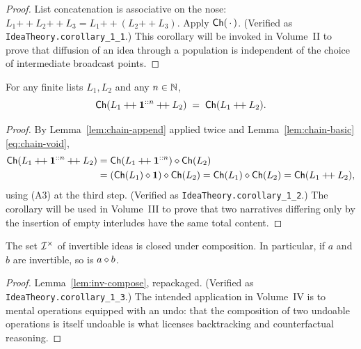 \begin{proof}
List concatenation is associative on the nose: $L_1 \mathbin{+\!+} L_2
\mathbin{+\!+} L_3 = L_1 \mathbin{+\!+} (L_2 \mathbin{+\!+} L_3)$.  Apply
$\mathsf{Ch}(\,\cdot\,)$.  (Verified as \texttt{IdeaTheory.corollary\_1\_1}.)
This corollary will be invoked in Volume~II to prove that diffusion of an
idea through a population is independent of the choice of intermediate
broadcast points.
\end{proof}

\begin{corollary}\label{cor:1-2}
For any finite lists $L_1, L_2$ and any $n \in \mathbb{N}$,
\begin{equation}\label{eq:cor-1-2}
\mathsf{Ch}(L_1 \mathbin{+\!+} \mathbf{1}^{::n} \mathbin{+\!+} L_2)
\;=\; \mathsf{Ch}(L_1 \mathbin{+\!+} L_2).
\end{equation}
\end{corollary}

\begin{proof}
By Lemma~\ref{lem:chain-append} applied twice and
Lemma~\ref{lem:chain-basic}\eqref{eq:chain-void},
\begin{align*}
\mathsf{Ch}(L_1 \mathbin{+\!+} \mathbf{1}^{::n} \mathbin{+\!+} L_2)
&= \mathsf{Ch}(L_1 \mathbin{+\!+} \mathbf{1}^{::n}) \mathbin{\diamond} \mathsf{Ch}(L_2) \\
&= (\mathsf{Ch}(L_1) \mathbin{\diamond} \mathbf{1}) \mathbin{\diamond} \mathsf{Ch}(L_2)
= \mathsf{Ch}(L_1) \mathbin{\diamond} \mathsf{Ch}(L_2)
= \mathsf{Ch}(L_1 \mathbin{+\!+} L_2),
\end{align*}
using (A3) at the third step.  (Verified as
\texttt{IdeaTheory.corollary\_1\_2}.)  The corollary will be used in
Volume~III to prove that two narratives differing only by the insertion
of empty interludes have the same total content.
\end{proof}

\begin{corollary}\label{cor:1-3}
The set $\mathcal{I}^{\times}$ of invertible ideas is closed under
composition.  In particular, if $a$ and $b$ are invertible, so is
$a \mathbin{\diamond} b$.
\end{corollary}

\begin{proof}
Lemma~\ref{lem:inv-compose}, repackaged.  (Verified as
\texttt{IdeaTheory.corollary\_1\_3}.)  The intended application in
Volume~IV is to mental operations equipped with an undo: that the
composition of two undoable operations is itself undoable is what
licenses backtracking and counterfactual reasoning.
\end{proof}

